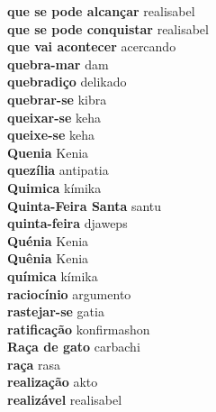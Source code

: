 \textbf{ que se pode alcançar  } realisabel \\
\textbf{ que se pode conquistar  } realisabel \\
\textbf{ que vai acontecer  } acercando \\
\textbf{ quebra-mar  } dam \\
\textbf{ quebradiço  } delikado \\
\textbf{ quebrar-se  } kibra \\
\textbf{ queixar-se  } keha \\
\textbf{ queixe-se  } keha \\
\textbf{ Quenia  } Kenia \\
\textbf{ quezília  } antipatia \\
\textbf{ Quimica  } kímika \\
\textbf{ Quinta-Feira Santa  } santu \\
\textbf{ quinta-feira  } djaweps \\
\textbf{ Quénia  } Kenia \\
\textbf{ Quênia  } Kenia \\
\textbf{ química  } kímika \\
\textbf{ raciocínio  } argumento \\
\textbf{ rastejar-se  } gatia \\
\textbf{ ratificação  } konfirmashon \\
\textbf{ Raça de gato  } carbachi \\
\textbf{ raça  } rasa \\
\textbf{ realização  } akto \\
\textbf{ realizável  } realisabel \\
